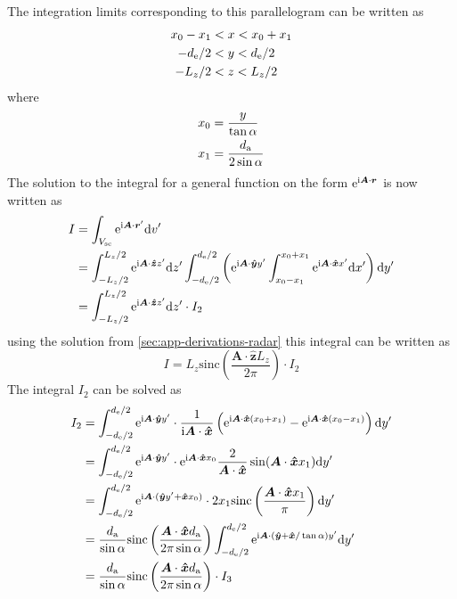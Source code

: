 \documentclass[11pt,twoside]{eitExjobb}
\begin{document}
	The integration limits corresponding to this parallelogram can be written as
	\begin{align*}
		x_0 - x_1 &< x < x_0 + x_1 \\
		-d_{\mathrm{e}}/2 &< y < d_{\mathrm{e}}/2 \\
		-L_{z}/2 &< z < L_{z}/2
	\end{align*}
	where
	\begin{align*}
		x_0 &= \frac{y}{\tan{\alpha}} \\
		x_1 &= \frac{d_{\mathrm{a}}}{2\sin{\alpha}}
	\end{align*}
	The solution to the integral for a general function on the form $\mathrm{e}^{\mathrm{i} \bm{A} \cdot \bm{r}}$ is now written as
	\begin{equation*}
	\begin{split}
			I &= \int_{V_{\mathrm{sc}}} \mathrm{e}^{\mathrm{i} \bm{A} \cdot \bm{r}'} \mathrm{d}v' \\
			&= \int_{-L_{z}/2}^{L_{z}/2} \mathrm{e}^{\mathrm{i} \bm{A} \cdot \bm{\hat{z}} z'} \mathrm{d}z'
			\int_{-d_{\mathrm{e}}/2}^{d_{\mathrm{e}}/2} \left( \mathrm{e}^{\mathrm{i} \bm{A} \cdot \bm{\hat{y}} y'}
			\int_{x_0-x_1}^{x_0+x_1} \mathrm{e}^{\mathrm{i} \bm{A} \cdot \bm{\hat{x}} x'} \mathrm{d}x' \right) \mathrm{d}y' \\
			&= \int_{-L_{z}/2}^{L_{z}/2} \mathrm{e}^{\mathrm{i} \bm{A} \cdot \bm{\hat{z}} z'} \mathrm{d}z' \cdot I_2
	\end{split}
	\end{equation*}
	using the solution from \ref{sec:app-derivations-radar}  this integral can be written as
	\begin{equation*}
		I = L_{z} \text{sinc}\left( \frac{\bm{A} \cdot \bm{\hat{z}} L_{z}}{2\pi} \right) \cdot I_2
	\end{equation*}
	The integral $I_2$ can be solved as
	\begin{equation*}
	\begin{split}
		I_2 &= \int_{-d_{\mathrm{e}}/2}^{d_{\mathrm{e}}/2} \mathrm{e}^{\mathrm{i} \bm{A} \cdot \bm{\hat{y}} y'}
		\cdot \frac{1}{\mathrm{i} \bm{A} \cdot \bm{\hat{x}}}
		\left( \mathrm{e}^{\mathrm{i} \bm{A} \cdot \bm{\hat{x}} (x_0+x_1)} - \mathrm{e}^{\mathrm{i} \bm{A} \cdot \bm{\hat{x}} (x_0-x_1)}\right) \mathrm{d}y' \\
		&=\int_{-d_{\mathrm{e}}/2}^{d_{\mathrm{e}}/2} \mathrm{e}^{\mathrm{i} \bm{A} \cdot \bm{\hat{y}} y'}
		\cdot \mathrm{e}^{\mathrm{i} \bm{A} \cdot \bm{\hat{x}} x_0} \frac{2}{\bm{A} \cdot \bm{\hat{x}}} \sin(\bm{A} \cdot \bm{\hat{x}} x_1) \mathrm{d}y' \\
		&=\int_{-d_{\mathrm{e}}/2}^{d_{\mathrm{e}}/2} \mathrm{e}^{\mathrm{i} \bm{A} \cdot (\bm{\hat{y}} y'+ \bm{\hat{x}} x_0)}
		\cdot 2x_1 \text{sinc}\left( \frac{\bm{A} \cdot \bm{\hat{x}} x_1}{\pi} \right) \mathrm{d}y' \\
		&= \frac{d_{\mathrm{a}}}{\sin{\alpha}} \text{sinc}\left( \frac{\bm{A} \cdot \bm{\hat{x}} d_{\mathrm{a}}}{2\pi \sin{\alpha}} \right) \int_{-d_{\mathrm{e}}/2}^{d_{\mathrm{e}}/2} \mathrm{e}^{\mathrm{i} \bm{A} \cdot (\bm{\hat{y}} + \bm{\hat{x}}/\tan{\alpha}) y'} \mathrm{d}y' \\
		&= \frac{d_{\mathrm{a}}}{\sin{\alpha}} \text{sinc}\left( \frac{\bm{A} \cdot \bm{\hat{x}} d_{\mathrm{a}}}{2\pi \sin{\alpha}} \right) \cdot I_3
	\end{split}
	\end{equation*}
\end{document}
